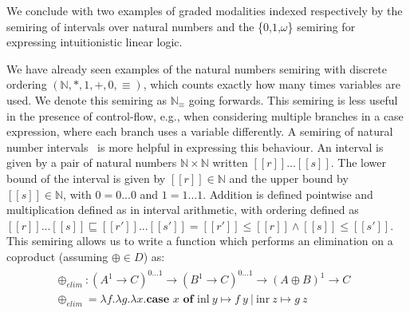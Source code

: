 We conclude with two examples of graded modalities indexed respectively
by the semiring of intervals over natural numbers and the \{$0$,$1$,$\omega$\} semiring for expressing
intuitionistic linear logic.
\begin{example}
  We have already seen examples of the natural numbers semiring with discrete
  ordering $({\mathbb{N}}, {*}, {1}, {+}, {0}, {\equiv})$, which counts exactly
  how many times variables are used. We denote this semiring as $\mathbb{N}_\equiv$ going forwards.
  This semiring is less useful in the
  presence of control-flow, e.g., when considering multiple branches in a case
  expression, where each branch uses a variable differently. A semiring of natural
  number intervals~\cite{DBLP:journals/pacmpl/OrchardLE19} is more helpful in expressing this behaviour. An
  interval is given by a pair of natural numbers
  $\mathbb{N} \times \mathbb{N}$ written $ [[ r ]] ... [[ s ]] $. The lower
  bound of the interval is given by $ [[ r ]] \in \mathbb{N}$ and the upper
  bound by $[[ s ]] \in \mathbb{N} $, with $0 = 0 ... 0$ and
  $1 = 1 ... 1$. Addition is defined pointwise and multiplication defined
  as in interval arithmetic, with
  ordering defined as
  $ [[r]] ... [[ s ]]  \sqsubseteq  [[r']] ... [[s']]  = [[ r']] \leq [[ r ]] \wedge [[ s ]] \leq [[ s' ]]$.
  This semiring allows us to write a function which performs an elimination on a
  coproduct (assuming $\oplus \in D$) as:
  \begin{align*}
    \begin{array}{ll}
    \oplus_{elim} : (A^{1} \rightarrow C)^{0...1} \rightarrow (B^{1} \rightarrow C)^{0...1} \rightarrow (A \oplus B)^{1} \rightarrow C &
    \\
    \oplus_{elim} = \lambda f. \lambda g . \lambda x. \textbf{case } x \textbf{ of } \text{inl}\ y \mapsto f\ y\ |\ \text{inr}\ z \mapsto g\ z&
    \end{array}
  \end{align*}
\end{example}


